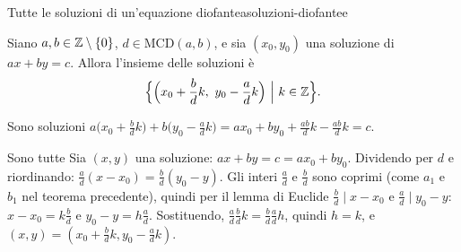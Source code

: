 \begin{concetto}
\begin{Teorema}{Tutte le soluzioni di un'equazione diofantea}{soluzioni-diofantee}
    \begin{prerequisiti}
    \end{prerequisiti}
    Siano $a, b \in \mathbb{Z} \setminus \{0\}$, $d \in \mathrm{MCD}(a, b)$, e sia $(x_0, y_0)$ una soluzione di $ax + by = c$. Allora l'insieme delle soluzioni è
    \[ \Big\{\Big(x_0 + \frac{b}{d}k,\ y_0 - \frac{a}{d}k\Big) \ \Big|\ k \in \mathbb{Z}\Big\}. \]
\end{Teorema}
\begin{dimostrazione}
    \begin{caso}{Sono soluzioni}
        $a\big(x_0 + \frac{b}{d}k\big) + b\big(y_0 - \frac{a}{d}k\big) = ax_0 + by_0 + \frac{ab}{d}k - \frac{ab}{d}k = c$.
    \end{caso}
    \begin{caso}{Sono tutte}
        Sia $(x, y)$ una soluzione: $ax + by = c = ax_0 + by_0$. Dividendo per $d$ e riordinando: $\frac{a}{d}(x - x_0) = \frac{b}{d}(y_0 - y)$. Gli interi
        $\frac{a}{d}$ e $\frac{b}{d}$ sono coprimi (come $a_1$ e $b_1$ nel teorema precedente), quindi per il lemma di Euclide $\frac{b}{d} \mid x - x_0$ e
        $\frac{a}{d} \mid y_0 - y$: $x - x_0 = k\frac{b}{d}$ e $y_0 - y = h\frac{a}{d}$. Sostituendo, $\frac{a}{d}\frac{b}{d}k = \frac{b}{d}\frac{a}{d}h$, quindi $h = k$, e
        $(x, y) = (x_0 + \frac{b}{d}k, y_0 - \frac{a}{d}k)$.
    \end{caso}
\end{dimostrazione}
\end{concetto}

